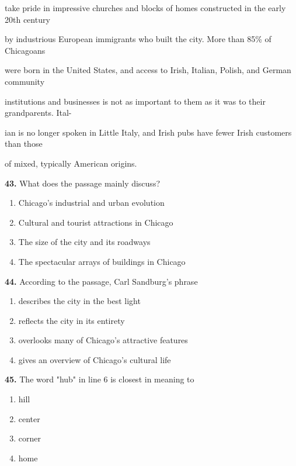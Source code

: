 \documentclass[12pt]{article}
\begin{document}
take pride in impressive churches and blocks of homes constructed in the early 20th century\par
by industrious European immigrants who built the city. More than 85\% of Chicagoans\par
were born in the United States, and access to Irish, Italian, Polish, and German community\par
institutions and businesses is not as important to them as it was to their grandparents. Ital-\par
ian is no longer spoken in Little Italy, and Irish pubs have fewer Irish customers than those\par
of mixed, typically American origins.\par
\endgroup
\medskip
\noindent\textbf{43.} What does the passage mainly discuss?
\begin{enumerate}[label=(\Alph*),leftmargin=*,itemsep=0.2em]
\item Chicago's industrial and urban evolution
\item Cultural and tourist attractions in Chicago
\item The size of the city and its roadways
\item The spectacular arrays of buildings in Chicago
\end{enumerate}
\par
\vspace{0.25\baselineskip}
\noindent\textbf{44.} According to the passage, Carl Sandburg's phrase
\begin{enumerate}[label=(\Alph*),leftmargin=*,itemsep=0.2em]
\item describes the city in the best light
\item reflects the city in its entirety
\item overlooks many of Chicago's attractive features
\item gives an overview of Chicago's cultural life
\end{enumerate}
\par
\vspace{0.25\baselineskip}
\noindent\textbf{45.} The word "hub" in line 6 is closest in meaning to
\begin{enumerate}[label=(\Alph*),leftmargin=*,itemsep=0.2em]
\item hill
\item center
\item corner
\item home
\end{enumerate}
\par
\end{document}

